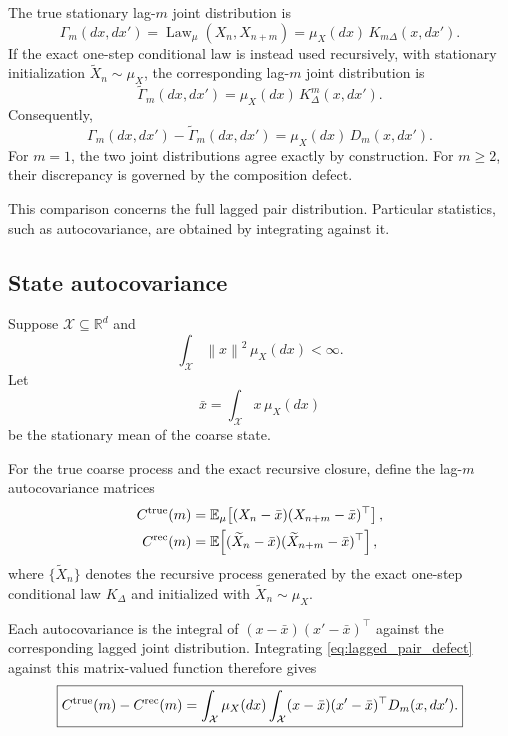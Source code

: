 \documentclass[final,hidelinks]{siamart251216}
\newcommand{\cX}{\mathcal{X}}
\newcommand{\Law}{\operatorname{Law}}
\newcommand{\E}{\mathbb{E}}
\newcommand{\norm}[1]{\left\lVert #1\right\rVert}
\begin{document}
The true stationary lag-$m$ joint distribution is
\begin{equation}
    \Gamma_m(dx,dx')
    =
    \Law_\mu(X_n,X_{n+m})
    =
    \mu_X(dx)\,K_{m\Delta}(x,dx').
    \label{eq:true_lagged_pair}
\end{equation}
If the exact one-step conditional law is instead used recursively, with
stationary initialization $\widetilde X_n\sim\mu_X$, the corresponding
lag-$m$ joint distribution is
\begin{equation}
    \widetilde\Gamma_m(dx,dx')
    =
    \mu_X(dx)\,K_\Delta^m(x,dx').
    \label{eq:recursive_lagged_pair}
\end{equation}
Consequently,
\begin{equation}
    \Gamma_m(dx,dx')-\widetilde\Gamma_m(dx,dx')
    =
    \mu_X(dx)\,D_m(x,dx').
    \label{eq:lagged_pair_defect}
\end{equation}
For $m=1$, the two joint distributions agree exactly by construction.
For $m\ge2$, their discrepancy is governed by the composition defect.

This comparison concerns the full lagged pair distribution. Particular
statistics, such as autocovariance, are obtained by integrating against it.

\subsection{State autocovariance}

Suppose $\cX\subseteq\mathbb R^d$ and
\[
    \int_{\cX}\norm{x}^2\,\mu_X(dx)<\infty.
\]
Let
\[
    \bar x
    =
    \int_{\cX}x\,\mu_X(dx)
\]
be the stationary mean of the coarse state.

For the true coarse process and the exact recursive closure, define the
lag-$m$ autocovariance matrices
\begin{equation}
\begin{aligned}
    C^{\rm true}(m)
    &=
    \E_\mu\!\left[
        (X_n-\bar x)
        (X_{n+m}-\bar x)^\top
    \right],\\
    C^{\rm rec}(m)
    &=
    \E\!\left[
        (\widetilde X_n-\bar x)
        (\widetilde X_{n+m}-\bar x)^\top
    \right],
\end{aligned}
    \label{eq:lagged_correlations}
\end{equation}
where $\{\widetilde X_n\}$ denotes the recursive process generated by the
exact one-step conditional law $K_\Delta$ and initialized with
$\widetilde X_n\sim\mu_X$.

Each autocovariance is the integral of
$(x-\bar x)(x'-\bar x)^\top$ against the corresponding lagged joint
distribution. Integrating \eqref{eq:lagged_pair_defect} against this
matrix-valued function therefore gives
\begin{equation}
\boxed{
    C^{\rm true}(m)-C^{\rm rec}(m)
    =
    \int_{\cX}\mu_X(dx)
    \int_{\cX}
    (x-\bar x)(x'-\bar x)^\top
    D_m(x,dx').
}
    \label{eq:corr_identity}
\end{equation}
\end{document}
